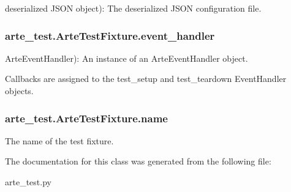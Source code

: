deserialized J\+S\+ON object)\+: The deserialized J\+S\+ON configuration file. 

\subsubsection[{event\+\_\+handler}]{\setlength{\rightskip}{0pt plus 5cm}arte\+\_\+test.\+Arte\+Test\+Fixture.\+event\+\_\+handler}\label{classarte__test_1_1_arte_test_fixture_acbd27814c30171ebeb3bc3b0dd2d7978}


Arte\+Event\+Handler)\+: An instance of an Arte\+Event\+Handler object. 

Callbacks are assigned to the test\+\_\+setup and test\+\_\+teardown Event\+Handler objects. 
\subsubsection[{name}]{\setlength{\rightskip}{0pt plus 5cm}arte\+\_\+test.\+Arte\+Test\+Fixture.\+name}\label{classarte__test_1_1_arte_test_fixture_abe682da10ac998fb93aa256004362abb}


The name of the test fixture. 



The documentation for this class was generated from the following file\+:\begin{DoxyCompactItemize}
\item 
arte\+\_\+test.\+py\end{DoxyCompactItemize}
